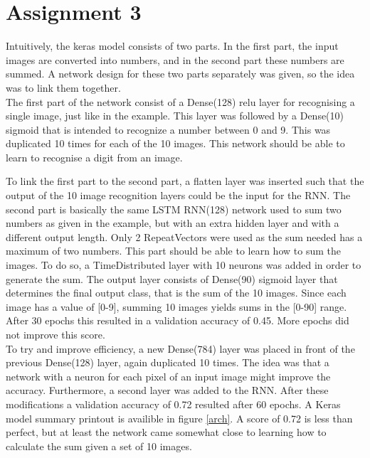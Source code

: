 \documentclass[a4paper,12pt]{article}
\begin{document}
\section{Assignment 3}
Intuitively, the keras model consists of two parts. In the first part, the input images are converted into numbers, and in the second part these numbers are summed. A network design for these two parts separately was given, so the idea was to link them together.\\

The first part of the network consist of a Dense(128) relu layer for recognising a single image, just like in the example. This layer was followed by a Dense(10) sigmoid that is intended to recognize a number between 0 and 9. This was duplicated 10 times for each of the 10 images. This network should be able to learn to recognise a digit from an image.

To link the first part to the second part, a flatten layer was inserted such that the output of the 10 image recognition layers could be the input for the RNN. The second part is basically the same LSTM RNN(128) network used to sum two numbers as given in the example, but with an extra hidden layer and with a different output length. Only 2 RepeatVectors were used as the sum needed has a maximum of two numbers. This part should be able to learn how to sum the images. To do so, a TimeDistributed layer with 10 neurons was added in order to generate the sum. The output layer consists of Dense(90) sigmoid layer that determines the final output class, that is the sum of the 10 images. Since each image has a value of [0-9], summing 10 images yields sums in the [0-90] range.
After 30 epochs this resulted in a validation accuracy of 0.45. More epochs did not improve this score.\\

To try and improve efficiency, a new Dense(784) layer was placed in front of the previous Dense(128) layer, again duplicated 10 times. The idea was that a network with a neuron for each pixel of an input image might improve the accuracy. Furthermore, a second layer was added to the RNN. After these modifications a validation accuracy of 0.72 resulted after 60 epochs. A Keras model summary printout is availible in figure \ref{arch}. A score of 0.72 is less than perfect, but at least the network came somewhat close to learning how to calculate the sum given a set of 10 images.\\
\end{document}
